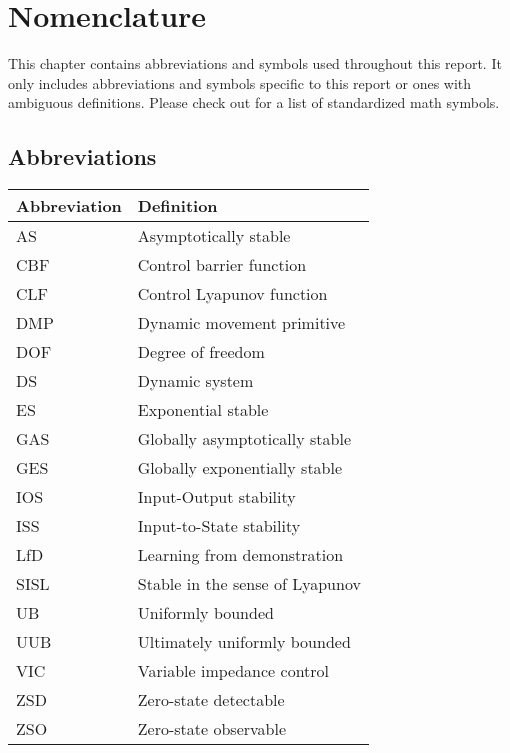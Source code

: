 \chapter*{Nomenclature}

This chapter contains abbreviations and symbols used throughout this report. It only includes abbreviations and symbols specific to this report or ones with ambiguous definitions. Please check out \cite{ListMathematicalSymbols2022} for a list of standardized math symbols.

\section*{Abbreviations}

\begin{longtable}{p{2.5cm}p{8cm}}
    \toprule
    Abbreviation & Definition                      \\
    \midrule\endhead %
    AS           & Asymptotically stable           \\
    CBF          & Control barrier function        \\
    CLF          & Control Lyapunov function       \\
    DMP          & Dynamic movement primitive      \\
    DOF          & Degree of freedom               \\
    DS           & Dynamic system                  \\   
    ES           & Exponential stable              \\
    GAS          & Globally asymptotically stable  \\
    GES          & Globally exponentially  stable  \\
    IOS          & Input-Output stability          \\
    ISS          & Input-to-State stability        \\
    LfD          & Learning from demonstration     \\
    SISL         & Stable in the sense of Lyapunov \\
    UB           & Uniformly bounded               \\
    UUB          & Ultimately uniformly bounded    \\
    VIC          & Variable impedance control      \\
    ZSD          & Zero-state detectable           \\
    ZSO          & Zero-state observable           \\
    \bottomrule
\end{longtable}

